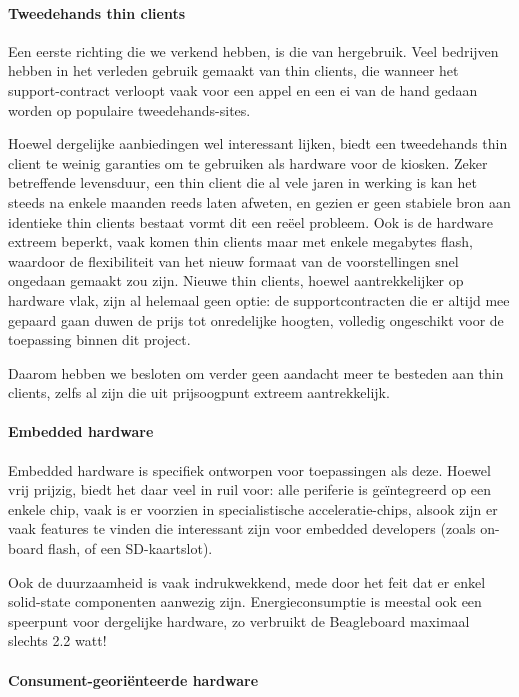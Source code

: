 \paragraph{Tweedehands thin clients}

Een eerste richting die we verkend hebben, is die van hergebruik. Veel bedrijven hebben in het verleden gebruik gemaakt van thin clients, die wanneer het support-contract verloopt vaak voor een appel en een ei van de hand gedaan worden op populaire tweedehands-sites.

Hoewel dergelijke aanbiedingen wel interessant lijken, biedt een tweedehands thin client te weinig garanties om te gebruiken als hardware voor de kiosken. Zeker betreffende levensduur, een thin client die al vele jaren in werking is kan het steeds na enkele maanden reeds laten afweten, en gezien er geen stabiele bron aan identieke thin clients bestaat vormt dit een reëel probleem. Ook is de hardware extreem beperkt, vaak komen thin clients maar met enkele megabytes flash, waardoor de flexibiliteit van het nieuw formaat van de voorstellingen snel ongedaan gemaakt zou zijn. Nieuwe thin clients, hoewel aantrekkelijker op hardware vlak, zijn al helemaal geen optie: de supportcontracten die er altijd mee gepaard gaan duwen de prijs tot onredelijke hoogten, volledig ongeschikt voor de toepassing binnen dit project.

Daarom hebben we besloten om verder geen aandacht meer te besteden aan thin clients, zelfs al zijn die uit prijsoogpunt extreem aantrekkelijk.

\paragraph{Embedded hardware}

Embedded hardware is specifiek ontworpen voor toepassingen als deze. Hoewel vrij prijzig, biedt het daar veel in ruil voor: alle periferie is geïntegreerd op een enkele chip, vaak is er voorzien in specialistische acceleratie-chips, alsook zijn er vaak features te vinden die interessant zijn voor embedded developers (zoals on-board flash, of een SD-kaartslot).

Ook de duurzaamheid is vaak indrukwekkend, mede door het feit dat er enkel solid-state componenten aanwezig zijn. Energieconsumptie is meestal ook een speerpunt voor dergelijke hardware, zo verbruikt de Beagleboard maximaal slechts 2.2 watt!

\paragraph{Consument-georiënteerde hardware}

